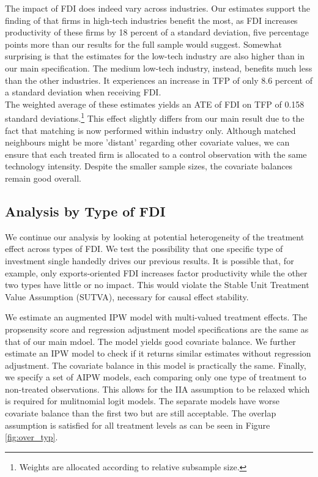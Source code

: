 \documentclass[a4paper,11pt]{scrartcl}
\begin{document}
The impact of FDI does indeed vary across industries. Our estimates support the finding of \citet{Keller2009} that firms in high-tech industries benefit the most, as FDI increases productivity of these firms by 18 percent of a standard deviation, five percentage points more than our results for the full sample would suggest. Somewhat surprising is that the estimates for the low-tech industry are also higher than in our main specification. The medium low-tech industry, instead, benefits much less than the other industries. It experiences an increase in TFP of only 8.6 percent of a standard deviation when receiving FDI. \\

The weighted average of these estimates yields an ATE of FDI on TFP of 0.158 standard deviations.\footnote{Weights are allocated according to relative subsample size.} This effect slightly differs from our main result due to the fact that matching is now performed within industry only. Although matched neighbours might be more 'distant' regarding other covariate values, we can ensure that each treated firm is allocated to a control observation with the same technology intensity. Despite the smaller sample sizes, the covariate balances remain good overall. 


\subsection{Analysis by Type of FDI}

We continue our analysis by looking at potential heterogeneity of the treatment effect across types of FDI. We test the possibility that one specific type of investment single handedly drives our previous results. It is possible that, for example, only exports-oriented FDI increases factor productivity while the other two types have little or no impact. This would violate the Stable Unit Treatment Value Assumption (SUTVA), necessary for causal effect stability. 

We estimate an augmented IPW model with multi-valued treatment effects. The propsensity score and regression adjustment model specifications are the same as that of our main mdoel. The model yields good covariate balance.
We further estimate an IPW model to check if it returns similar estimates without regression adjustment. The covariate balance in this model is practically the same. Finally, we specify a set of AIPW models, each comparing only one type of treatment to non-treated observations. This allows for the IIA assumption to be relaxed which is required for mulitnomial logit models. The separate models have worse covariate balance than the first two but are still acceptable. The overlap assumption is satisfied for all treatment levels as can be seen in Figure \ref{fig:over_typ}. 
\end{document}
